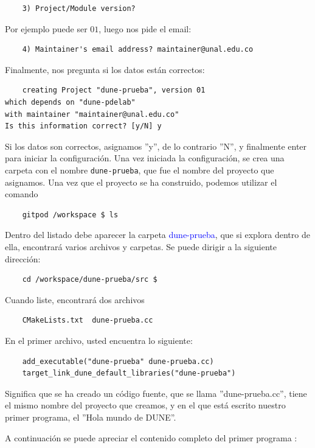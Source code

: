 \begin{verbatim}
	3) Project/Module version? 
\end{verbatim}
Por ejemplo puede ser $01$, luego nos pide el email:
\begin{verbatim}
	4) Maintainer's email address? maintainer@unal.edu.co 
\end{verbatim}
Finalmente, nos pregunta si los datos están correctos:
\begin{verbatim}
	creating Project "dune-prueba", version 01 
which depends on "dune-pdelab"
with maintainer "maintainer@unal.edu.co"
Is this information correct? [y/N] y
\end{verbatim}
Si los datos son correctos, asignamos ''y'', de lo contrario ''N'', y finalmente enter para iniciar la configuración. Una vez iniciada la configuración,
se crea una carpeta con el nombre \verb|dune-prueba|, que fue el nombre del proyecto que asignamos.  Una vez que
el proyecto se ha construido, podemos utilizar el comando \begin{verbatim}
	gitpod /workspace $ ls
\end{verbatim}
Dentro del listado debe aparecer la carpeta \textcolor{blue}{dune-prueba}, que si explora dentro de ella, encontrará
varios archivos y carpetas.  Se puede dirigir a la siguiente dirección: {\begin{verbatim}
	cd /workspace/dune-prueba/src $ 
\end{verbatim}}Cuando liste, encontrará dos archivos \begin{verbatim}
	CMakeLists.txt  dune-prueba.cc
\end{verbatim}
En el primer archivo, usted encuentra lo siguiente:
\begin{verbatim}
	add_executable("dune-prueba" dune-prueba.cc)
	target_link_dune_default_libraries("dune-prueba")
\end{verbatim}
Significa que se ha creado un código fuente, que se llama ''dune-prueba.cc'', tiene el mismo nombre del proyecto que
creamos, y en el que está escrito nuestro primer programa, el ''Hola mundo de DUNE''.

A continuación se puede apreciar el contenido completo del primer programa :
\begin{listing}
	\inputminted{cpp}{../../src/dune-learn.cc}
\end{listing}
